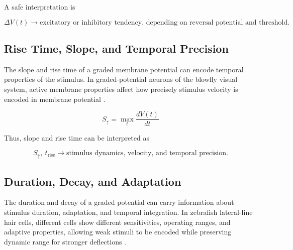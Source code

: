 \documentclass[a4paper]{article}
\begin{document}
            A safe interpretation is
            
            \begin{equation}
                \Delta V(t)
                \rightarrow
                \text{excitatory or inhibitory tendency, depending on reversal potential and threshold}.
            \end{equation}
        
        \subsection{Rise Time, Slope, and Temporal Precision}
            
            The slope and rise time of a graded membrane potential can encode temporal properties of the stimulus. In graded-potential neurons of the blowfly visual system, active membrane properties affect how precisely stimulus velocity is encoded in membrane potential \citep{haag-1998-active-membrane-properties-and-signal-encoding-in-graded-potential-neurons}.
            
            \begin{equation}
                S_{\uparrow}
                =
                \max_t \frac{dV(t)}{dt}
            \end{equation}
            
            Thus, slope and rise time can be interpreted as
            
            \begin{equation}
                S_{\uparrow},\ t_{\mathrm{rise}}
                \rightarrow
                \text{stimulus dynamics, velocity, and temporal precision}.
            \end{equation}
        
        \subsection{Duration, Decay, and Adaptation}
            
            The duration and decay of a graded potential can carry information about stimulus duration, adaptation, and temporal integration. In zebrafish lateral-line hair cells, different cells show different sensitivities, operating ranges, and adaptive properties, allowing weak stimuli to be encoded while preserving dynamic range for stronger deflections \citep{pichler-2019-the-transfer-characteristics-of-hair-cells-encoding-mechanical-stimuli-in-the-lateral-line-of-zebrafish}.
            
\end{document}
